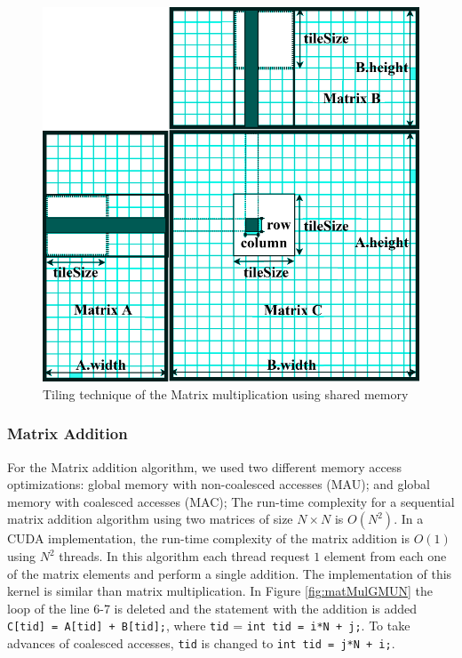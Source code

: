 \begin{figure}[htpb]
	\centering
    \includegraphics[scale=.3]{images/square-tiling.png}
    \caption{Tiling technique of the Matrix multiplication using shared memory}
    \label{fig:TilingMMSU}
\end{figure}

\subsubsection{Matrix Addition}
For the Matrix addition algorithm, we used two different memory access optimizations: global memory with non-coalesced accesses (MAU); and global memory with coalesced accesses (MAC);  The run-time complexity for a sequential matrix addition algorithm using two matrices of size $N\times{}N$ is $O(N^2)$. In a CUDA implementation, the run-time complexity of the matrix addition is $O(1)$ using $N^2$ threads. In this algorithm each thread request $1$ element from each one of the matrix elements and perform a single addition. The implementation of this kernel is similar than matrix multiplication. In Figure \ref{fig:matMulGMUN} the loop of the line 6-7 is deleted and the statement with the addition is added \texttt{C[tid] = A[tid] + B[tid];}, where \texttt{tid} = \texttt{int tid = i*N + j;}. To take advances of coalesced accesses, \texttt{tid} is changed to \texttt{int tid = j*N + i;}. 

